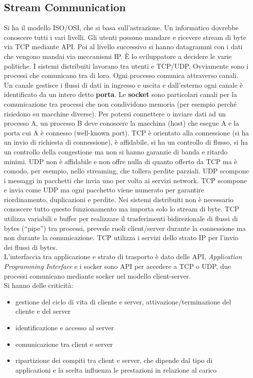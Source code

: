 \documentclass[a4paper,12pt, oneside]{book}
\begin{document}
\subsection{Stream Communication}
Si ha il modello ISO/OSI, che si basa sull'astrazione. Un informatico dovrebbe conoscere tutti i vari livelli. Gli utenti possono mandare e ricevere stream di byte via TCP mediante API. Poi al livello successivo si hanno datagrammi con i dati che vengono mandai via meccanismi IP. È lo sviluppatore a decidere le varie politiche. I sistemi distribuiti lavorano tra utenti e TCP/UDP. Ovviamente sono i processi che comunicano tra di loro. Ogni processo comunica attraverso canali. Un canale gestisce i flussi di dati in ingresso e uscita e dall'esterno ogni canale è identificato da un intero detto \textbf{porta}. Le \textbf{socket} sono particolari canali per la comunicazione tra processi che non condividono memoria (per esempio perché risiedono su macchine diverse). Per potersi connettere o inviare dati ad un processo A, un processo B deve conoscere la macchina (host) che esegue A e la porta cui A è connesso (well-known port).   TCP è orientato alla connessione (si ha un invio di richiesta di connessione), è affidabile, si ha un controllo di flusso, si ha un controllo della congestione ma non si hanno garanzie di banda e ritardo minimi. UDP non è affidabile e non offre nulla di quanto offerto da TCP ma è comodo, per esempio, nello streaming, che tollera perdite parziali. UDP scompone i messaggi in pacchetti che invia uno per volta ai servizi network. TCP scompone e invia come UDP ma ogni pacchetto viene numerato per garantire riordinamento, duplicazioni e perdite. Nei sistemi distribuiti non è necessario conoscere tutto questo funzionamento ma importa solo lo stream di byte. TCP utilizza variabili e buffer per realizzare il trasferimenti bidirezionale di flussi di bytes (“pipe”) tra processi, prevede ruoli client/server durante la connessione ma non durante la comunicazione. TCP utilizza i servizi dello strato IP per l'invio dei flussi di bytes.\\
L'interfaccia tra applicazione e strato di trasporto è dato delle API, \textit{Application Programming Interface}  e i socker sono API per accedere a TCP o UDP, due processi comunicano mediante socker nel modello client-server.\\
Si hanno delle criticità:
\begin{itemize}
\item gestione del ciclo di vita di cliente e server, attivazione/terminazione del cliente e del server
\item identificazione e accesso al server
\item comunicazione tra client e server
\item ripartizione dei compiti tra client e server, che dipende dal tipo di applicazioni e la scelta influenza le prestazioni in relazione al carico
\end{itemize}
\end{document}
